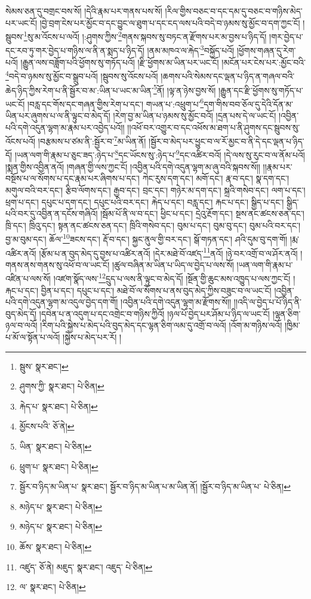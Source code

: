 སེམས་ཅན་དུ་བགྲང་བས་སོ། །དེའི་རྣམ་པར་གནས་པས་སོ། །རིལ་གྱིས་བཅང་བ་དང་དམ་དུ་བཅང་བ་གཉིས་མེད་པར་ཡང་ངོ། །བྱེ་བྲག་ངེས་པར་མྱོང་བ་དང་བྱུང་ལ་ཐུག་པ་དང་ངད་ལས་པའི་བདེ་བ་ཉམས་སུ་མྱོང་བ་དག་ཀྱང་ངོ། །སྦུབས་\footnote{སྦུས་  སྣར་ཐང་། }སུ་མ་འོངས་པ་ལའོ། །:ཤུགས་ཀྱིས་\footnote{ཤུགས་ཀྱི་  སྣར་ཐང་།  པེ་ཅིན། }གནས་སྐབས་སུ་བཏང་ན་རྫོགས་པར་མ་བྱས་པ་ཉིད་དོ། །གར་བྱེད་པ་དང་རབ་ཏུ་གར་བྱེད་པ་གཉིས་ལ་ནི་ན་སྨད་པ་ཉིད་དོ། །ནམ་མཁའ་ལ་རྐེད་\footnote{རྐེད་པ་  སྣར་ཐང་།  པེ་ཅིན། }བསྐྱོད་པའོ། །ཕྱོགས་གཞན་དུ་རེག་པའོ། །རྒྱུན་ལས་བཟློག་པའི་ཕྱོགས་སུ་གཏོད་པའོ། །རྫི་ཕྱོགས་མ་ཡིན་པར་ཡང་ངོ། །མངོན་པར་ངེས་པར་:མྱོང་བའི་\footnote{མྱོངས་པའི་  ཅོ་ནེ། }བདེ་བ་ཉམས་སུ་མྱོང་བ་སྒྲུབ་པའོ། །སྦུབས་སུ་འོངས་པའོ། །ཆགས་པའི་སེམས་དང་ལྡན་པ་ཉིད་ན་གཞལ་བའི་ཆེད་ཉིད་ཀྱིས་རེག་པ་ནི་སྦྱོར་བ་མ་:ཡིན་པ་ཡང་མ་ཡིན་\footnote{ཡིན་  སྣར་ཐང་།  པེ་ཅིན། }ནོ། །ལྟ་ན་ཉེས་བྱས་སོ། །རྒྱུན་དང་རྫི་ཕྱོགས་སུ་གཏོད་པ་ཡང་ངོ། །བརླ་དང་གོས་དང་གཞན་གྱིས་རེག་པ་དང་། གཡན་པ་:འཕྲུག་པ་\footnote{ཕྲུག་པ་  སྣར་ཐང་།  པེ་ཅིན། }དག་གིས་བབ་ཅོལ་དུ་དེའི་དོན་མ་ཡིན་པར་ཞུགས་པ་ལ་ནི་ལྟུང་བ་མེད་དོ། །རེག་བྱ་མ་ཡིན་པ་ཉམས་སུ་མྱོང་བའོ། །དྲན་པས་དེ་ལ་ཡང་ངོ། །འབྱིན་པའི་དགེ་འདུན་ལྷག་མ་རྣམ་པར་འབྱེད་པའོ།། །།འཕོ་བར་འགྱུར་བ་དང་འཕོས་མ་ཐག་པ་ནི་ཤུགས་དང་སྦུབས་སུ་འོངས་པའོ། །བརྩམས་པ་ཙམ་ནི་:སྦྱོར་བ་\footnote{སྦྱོར་བ་ཉིད་མ་ཡིན་པ་  སྣར་ཐང་། སྦྱོར་བ་ཉིད་མ་ཡིན་པ་མ་ཡིན་ནོ། །སྦྱོར་བ་ཉིད་མ་ཡིན་པ་  པེ་ཅིན། }མ་ཡིན་ནོ། །སྦྱོར་བ་མེད་པར་ཕྱུང་བ་ལ་རོ་མྱང་བ་ནི་དེ་དང་ལྡན་པ་ཉིད་དོ། །ཡན་ལག་གི་རྣམ་པ་ཅུང་ཟད་:ཉེད་པ་\footnote{མཉེད་པ་  སྣར་ཐང་།  པེ་ཅིན། }དང་ཡོངས་སུ་:ཉེད་པ་\footnote{མཉེད་པ་  སྣར་ཐང་།  པེ་ཅིན། }དང་འཚིར་བའོ། །དེ་ལས་སུ་རུང་བ་ལ་ནོམ་པའོ། །སྨན་གྱིས་འབྱིན་ནའོ། །གཞན་གྱི་ལས་ཀྱང་ངོ། །འབྱིན་པའི་དགེ་འདུན་ལྷག་མ་ཞུ་བའི་སྐབས་སོ།། །།རྣམ་པར་བསྔོས་པ་ལ་སོགས་པ་དང་རྣམ་པར་ཞིགས་པ་དང་། ཀེང་རུས་དག་དང་། མགོ་དང་། རྣ་བ་དང་། སྣ་དག་དང་། མགུལ་བའི་བར་དང་། རྩིབ་ལོགས་དང་། རྒྱབ་དང་། བྲང་དང་། གཉེར་མ་དག་དང་། སྐྲའི་གསེབ་དང་། ལག་པ་དང་། ཕྲག་པ་དང་། དཔུང་པ་དག་དང་། དཔུང་པའི་བར་དང་། རྐེད་པ་དང་། བརླ་དང་། རྐང་པ་དང་། སྒྱིད་པ་དང་། སྒྱིད་པའི་བར་དུ་འབྱིན་ན་དངོས་གཞིའོ། །སྦོམ་པོ་ནི་ལ་བ་དང་། ཕྱིང་པ་དང་། དྲེའུ་རྔོག་དང་། སྔས་ནང་ཚངས་ཅན་དང་། ཁྲི་དང་། ཁྲིའུ་དང་། སྟན་ནང་ཚངས་ཅན་དང་། ཁྲིའི་གསེབ་དང་། བུམ་པ་དང་། བུམ་བུ་དང་། བུམ་པའི་བར་དང་། བྱ་མ་བུམ་དང་། ཆོལ་\footnote{ཆོས་  སྣར་ཐང་།  པེ་ཅིན། }ཟངས་དང་། རྡོ་བ་དང་། སྐྱང་ནུལ་གྱི་བར་དང་། སྒོ་གཏན་དང་། ཤའི་དུམ་བུ་དག་གོ། །རྨ་འཚིར་ནའོ། །རྩོམ་པ་ན་བུད་མེད་དུ་བྱས་པ་འཚིར་ནའོ། །དེར་མཐེ་བོ་འཛད་\footnote{འཛུད་  ཅོ་ནེ། མཇུད་  སྣར་ཐང་། འཇུད་  པེ་ཅིན། }ནའོ། །ཉེ་བར་འགྲོ་བ་ལ་ཤོར་ནའོ། །གནས་ནས་གནས་སུ་འཕོ་བ་ལ་ཡང་ངོ། །ཚུལ་བཞིན་མ་ཡིན་པ་ཡིད་ལ་བྱེད་པ་ལས་སོ། །ཡན་ལག་གི་རྣམ་པ་འཛིན་པ་ལས་སོ། །འཛག་སྣོད་ལས་\footnote{ལ་  སྣར་ཐང་།  པེ་ཅིན། }དྲུད་པ་ལས་ནི་ལྟུང་བ་མེད་དོ། །སྔོན་གྱི་ཆུང་མས་འཁྱུད་པ་ལས་ཀྱང་ངོ། །རྐང་པ་དང་། བྱིན་པ་དང་། དཔུང་པ་དང་། མཐེ་བོ་ལ་སོགས་པ་ནས་བུད་མེད་ཀྱིས་བཟུང་བ་ལ་ཡང་ངོ། །འབྱིན་པའི་དགེ་འདུན་ལྷག་མ་འདུལ་བྱེད་དག་གོ། །འབྱིན་པའི་དགེ་འདུན་ལྷག་མ་རྫོགས་སོ།། །།འདི་ལ་བྱེད་པ་པོ་ཉིད་ནི་བུད་མེད་དོ། །དབེན་པ་ན་འདུག་པ་དང་འགྲེང་བ་གཉིས་ཀྱིའོ། །ཉལ་པོ་བྱེད་པར་ཤོམ་པ་ཉིད་ལ་ཡང་ངོ། །ལྷན་ཅིག་ཉལ་བ་ལའོ། །རིག་པའི་སྐྱེས་པ་མེད་པའི་བུད་མེད་དང་ལྷན་ཅིག་ལམ་དུ་འགྲོ་བ་ལའོ། །འོག་མ་གཉིས་ལའོ། །ཁྱིམ་པ་མོ་ལ་སྟོན་པ་ལའོ། །སྐྱེས་པ་མེད་པར་རོ། །
